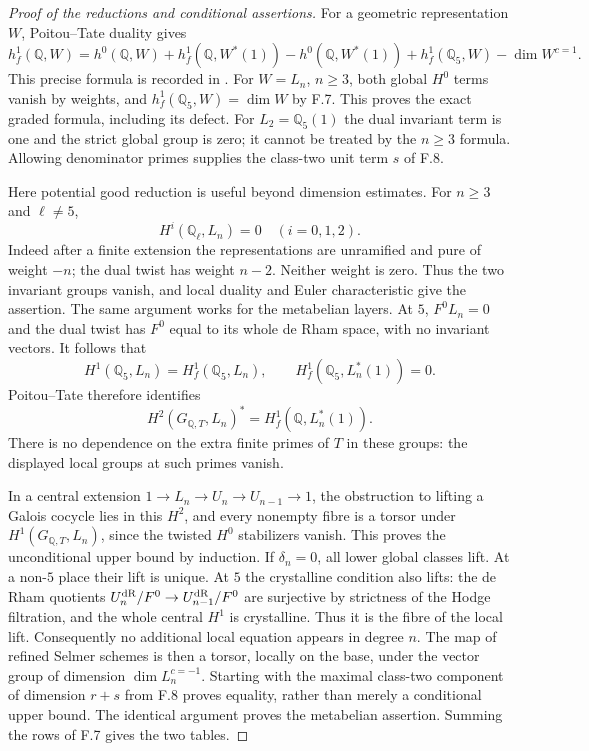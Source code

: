 \begin{proof}[Proof of the reductions and conditional assertions]
For a geometric representation $W$, Poitou--Tate duality gives
\[
 h_f^1(\mathbb Q,W)=h^0(\mathbb Q,W)
 +h_f^1(\mathbb Q,W^*(1))-h^0(\mathbb Q,W^*(1))
 +h_f^1(\mathbb Q_5,W)-\dim W^{c=1}.
\]
This precise formula is recorded in
\citet[(5.6)]{FE_LLM2023}. For $W=L_n$, $n\ge3$, both global
$H^0$ terms vanish by weights, and $h_f^1(\mathbb Q_5,W)=\dim W$
by F.7. This proves the exact graded formula, including its defect.
For $L_2=\mathbb Q_5(1)$ the dual invariant term is one and the strict
global group is zero; it cannot be treated by the $n\ge3$ formula.
Allowing denominator primes supplies the class-two unit term $s$ of F.8.

Here potential good reduction is useful beyond dimension estimates.
For $n\ge3$ and $\ell\ne5$,
\[
 H^i(\mathbb Q_\ell,L_n)=0\quad(i=0,1,2).
\]
Indeed after a finite extension the representations are unramified and
pure of weight $-n$; the dual twist has weight $n-2$. Neither weight
is zero. Thus the two invariant groups vanish, and local duality and
Euler characteristic give the assertion. The same argument works for
the metabelian layers. At $5$, $F^0L_n=0$ and the dual twist has
$F^0$ equal to its whole de Rham space, with no invariant vectors.
It follows that
\[
 H^1(\mathbb Q_5,L_n)=H_f^1(\mathbb Q_5,L_n),\qquad
 H_f^1(\mathbb Q_5,L_n^*(1))=0.
\]
Poitou--Tate therefore identifies
\[
 H^2(G_{\mathbb Q,T},L_n)^*
       =H_f^1(\mathbb Q,L_n^*(1)).
\]
There is no dependence on the extra finite primes of $T$ in these
groups: the displayed local groups at such primes vanish.

In a central extension
$1\to L_n\to U_n\to U_{n-1}\to1$, the obstruction to lifting a
Galois cocycle lies in this $H^2$, and every nonempty fibre is a
torsor under $H^1(G_{\mathbb Q,T},L_n)$, since the twisted $H^0$
stabilizers vanish. This proves the unconditional upper bound by
induction. If $\delta_n=0$, all lower global classes lift. At a
non-$5$ place their lift is unique. At $5$ the crystalline condition
also lifts: the de Rham quotients
$U_n^{\rm dR}/F^0\to U_{n-1}^{\rm dR}/F^0$ are surjective by
strictness of the Hodge filtration, and the whole central $H^1$ is
crystalline. Thus it is the fibre of the local lift.
Consequently no additional local equation appears in degree $n$.
The map of refined Selmer schemes is then a torsor, locally on the
base, under the vector group of dimension $\dim L_n^{c=-1}$.
Starting with the maximal class-two component of dimension $r+s$
from F.8 proves equality, rather than merely a conditional upper
bound. The identical argument proves the metabelian assertion.
Summing the rows of F.7 gives the two tables.


\end{proof}
